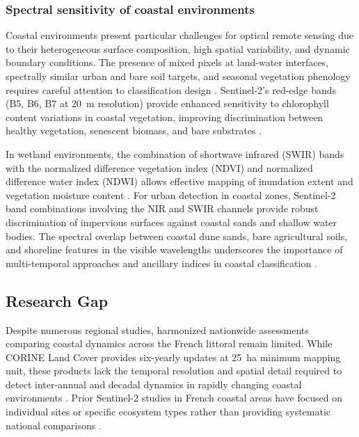 \documentclass[remotesensing,article,submit,pdftex,moreauthors]{Definitions/mdpi}
\begin{document}
\subsubsection{Spectral sensitivity of coastal environments}

Coastal environments present particular challenges for optical remote sensing due to their heterogeneous surface composition, high spatial variability, and dynamic boundary conditions. The presence of mixed pixels at land-water interfaces, spectrally similar urban and bare soil targets, and seasonal vegetation phenology requires careful attention to classification design \citep{Lemenkova202411}. Sentinel-2's red-edge bands (B5, B6, B7 at 20~m resolution) provide enhanced sensitivity to chlorophyll content variations in coastal vegetation, improving discrimination between healthy vegetation, senescent biomass, and bare substrates \citep{Mercieretal2019, doNascimentoBendinietal2024}.

In wetland environments, the combination of shortwave infrared (SWIR) bands with the normalized difference vegetation index (NDVI) and normalized difference water index (NDWI) allows effective mapping of inundation extent and vegetation moisture content \citep{gaudart2021zones,jmse12050709,berhault2020sentinel}. For urban detection in coastal zones, Sentinel-2 band combinations involving the NIR and SWIR channels provide robust discrimination of impervious surfaces against coastal sands and shallow water bodies. The spectral overlap between coastal dune sands, bare agricultural soils, and shoreline features in the visible wavelengths underscores the importance of multi-temporal approaches and ancillary indices in coastal classification \citep{inglada2017sits,Gatis2022}.

\subsection{Research Gap}

Despite numerous regional studies, harmonized nationwide assessments comparing coastal dynamics across the French littoral remain limited. While CORINE Land Cover provides six-yearly updates at 25~ha minimum mapping unit, these products lack the temporal resolution and spatial detail required to detect inter-annual and decadal dynamics in rapidly changing coastal environments \citep{meur-ferec2007artificialisation}. Prior Sentinel-2 studies in French coastal areas have focused on individual sites or specific ecosystem types rather than providing systematic national comparisons \citep{berhault2020sentinel}.
\end{document}
